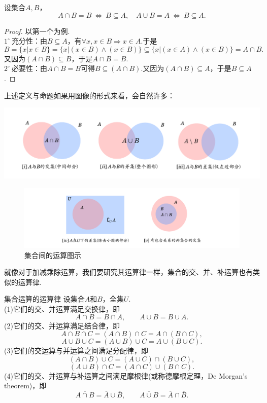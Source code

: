 \documentclass[lang=cn, zihao=5]{elegantbook}
\newcommand{\buzhou}[1]{$#1^{\circ} \ $}
\begin{document}
\begin{proposition}
	设集合$A,B$，
	$$A \cap B = B ~ \Leftrightarrow ~ B \subseteq A ,\quad A \cup B = A ~ \Leftrightarrow ~ B \subseteq A.$$
\end{proposition}
\begin{proof}
	以第一个为例. \\
	\buzhou{1}充分性：由$B \subseteq A$，有$\forall x, x \in B \Rightarrow x \in A$.于是$$B = \{ x|x \in B \} = \{ x|(x \in B) \wedge (x \in B) \} \subseteq \{ x|(x \in A) \wedge (x \in B) \} = A \cap B.$$
	又因为$(A \cap B) \subseteq B$，于是$A \cap B = B$. \\
	\buzhou{2}必要性：由$A \cap B = B$可得$B \subseteq (A \cap B)$.又因为$(A \cap B) \subseteq A$，于是$B \subseteq A$.
\end{proof}

上述定义与命题如果用图像的形式来看，会自然许多：

\begin{center}
	\includegraphics{attachment/20230318jihe.pdf}
\end{center}
\begin{figure}[H]
	\centering
	\includegraphics{attachment/20230318jihe2.pdf}
	\caption{集合间的运算图示}
\end{figure}

就像对于加减乘除运算，我们要研究其运算律一样，集合的交、并、补运算也有类似的运算律.

\begin{proposition}{集合运算的运算律}
	设集合$A$和$B$，全集$U$. \\
	(1)它们的交、并运算满足交换律，即$$A \cap B = B \cap A, \qquad A \cup B = B \cup A.$$
	(2)它们的交、并运算满足结合律，即
	$$A \cap B \cap C = (A \cap B) \cap C = A \cap (B \cap C),$$
	$$A \cup B \cup C = (A \cup B) \cup C = A \cup (B \cup C).$$
	(3)它们的交运算与并运算之间满足分配律，即
	$$(A \cap B) \cup C = (A \cup C) \cap (B \cup C),$$
	$$(A \cup B) \cap C = (A \cap C) \cup (B \cap C).$$
	(4)它们的交、并运算与补运算之间满足摩根律(或称德摩根定理，De Morgan's theorem)，即$$\overline{A \cap B} = \overline{A} \cup \overline{B}, \qquad \overline{A \cup B} = \overline{A} \cap \overline{B}.$$
\end{proposition}
\end{document}
